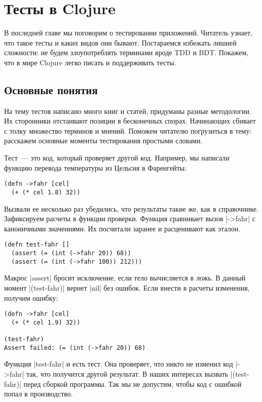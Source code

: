 \chapter{Тесты в Clojure}

\begin{teaser}
В последней главе мы поговорим о тестировании приложений. Читатель узнает, что
такое тесты и каких видов они бывают. Постараемся избежать лишней сложности: не
будем злоупотреблять терминами вроде TDD и BDT. Покажем, что в мире Clojure
легко писать и поддерживать тесты.
\end{teaser}

\section{Основные понятия}

На тему тестов написано много книг и статей, придуманы разные методологии. Их
сторонники отстаивают позиции в бесконечных спорах. Начинающих сбивает с толку
множество терминов и мнений. Поможем читателю погрузиться в тему: расскажем
основные моменты тестирования простыми словами.

Тест~--- это код, который проверяет другой код. Например, мы написали функцию
перевода температуры из Цельсия в Фаренгейты:

\begin{verbatim}
(defn ->fahr [cel]
  (+ (* cel 1.8) 32))
\end{verbatim}

Вызвали ее несколько раз убедились, что результаты такие же, как в
справочнике. Зафиксируем расчеты в функции проверки. Функция сравнивает вызов
\spverb|->fahr| с каноничными значениями. Их посчитали заранее и расценивают как
эталон.

\begin{verbatim}
(defn test-fahr []
  (assert (= (int (->fahr 20)) 68))
  (assert (= (int (->fahr 100)) 212)))
\end{verbatim}

Макрос \spverb|assert| бросит исключение, если тело вычисляется в ложь. В данный
момент \spverb|(test-fahr)| вернет \spverb|nil| без ошибок. Если внести в
расчеты изменения, получим ошибку:

\begin{verbatim}
(defn ->fahr [cel]
  (+ (* cel 1.9) 32))

(test-fahr)
Assert failed: (= (int (->fahr 20)) 68)
\end{verbatim}

Функция \spverb|test-fahr| и есть тест. Она проверяет, что никто не изменил код
\spverb|->fahr| так, что получится другой результат. В наших интересах вызвать
\spverb|(test-fahr)| перед сборкой программы. Так мы не допустим, чтобы код с
ошибкой попал в производство.

